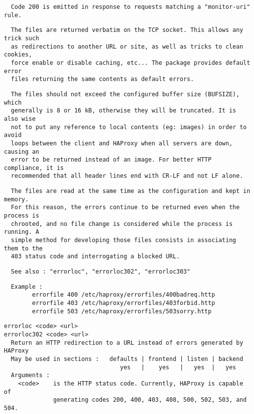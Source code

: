 \begin{verbatim}
  Code 200 is emitted in response to requests matching a "monitor-uri" rule.
\end{verbatim}

\begin{verbatim}
  The files are returned verbatim on the TCP socket. This allows any trick such
  as redirections to another URL or site, as well as tricks to clean cookies,
  force enable or disable caching, etc... The package provides default error
  files returning the same contents as default errors.
\end{verbatim}

\begin{verbatim}
  The files should not exceed the configured buffer size (BUFSIZE), which
  generally is 8 or 16 kB, otherwise they will be truncated. It is also wise
  not to put any reference to local contents (eg: images) in order to avoid
  loops between the client and HAProxy when all servers are down, causing an
  error to be returned instead of an image. For better HTTP compliance, it is
  recommended that all header lines end with CR-LF and not LF alone.
\end{verbatim}

\begin{verbatim}
  The files are read at the same time as the configuration and kept in memory.
  For this reason, the errors continue to be returned even when the process is
  chrooted, and no file change is considered while the process is running. A
  simple method for developing those files consists in associating them to the
  403 status code and interrogating a blocked URL.
\end{verbatim}

\begin{verbatim}
  See also : "errorloc", "errorloc302", "errorloc303"
\end{verbatim}

\begin{verbatim}
  Example :
        errorfile 400 /etc/haproxy/errorfiles/400badreq.http
        errorfile 403 /etc/haproxy/errorfiles/403forbid.http
        errorfile 503 /etc/haproxy/errorfiles/503sorry.http
\end{verbatim}

\begin{verbatim}
errorloc <code> <url>
errorloc302 <code> <url>
  Return an HTTP redirection to a URL instead of errors generated by HAProxy
  May be used in sections :   defaults | frontend | listen | backend
                                 yes   |    yes   |   yes  |   yes
  Arguments :
    <code>    is the HTTP status code. Currently, HAProxy is capable of
              generating codes 200, 400, 403, 408, 500, 502, 503, and 504.
\end{verbatim}

